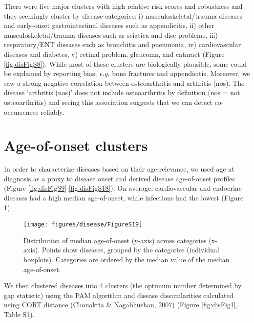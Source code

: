 \documentclass[12pt,twoside]{unicam}
\begin{document}
There were five major clusters with high relative risk scores and robustness and they seemingly cluster by disease categories: i) musculoskeletal/trauma diseases and early-onset gastrointestinal diseases such as appendicitis, ii) other musculoskeletal/trauma diseases such as sciatica and disc problems, iii) respiratory/ENT diseases such as bronchitis and pneumonia, iv) cardiovascular diseases and diabetes, v) retinal problem, glaucoma, and cataract (Figure \ref{fig:disFigS8}). While most of these clusters are biologically plausible, some could be explained by reporting bias, \emph{e.g.} bone fractures and appendicitis. Moreover, we saw a strong negative correlation between osteoarthritis and arthritis (nos). The disease `arthritis (nos)' does not include osteoarthritis by definition (nos = not osteoarthritis) and seeing this association suggests that we can detect co-occurrences reliably.

\hypertarget{age-of-onset-clusters}{%
\section{Age-of-onset clusters}\label{age-of-onset-clusters}}

In order to characterize diseases based on their age-relevance, we used age at diagnosis as a proxy to disease onset and derived disease age-of-onset profiles (Figure \ref{fig:disFigS9}-\ref{fig:disFigS18}). On average, cardiovascular and endocrine diseases had a high median age-of-onset, while infections had the lowest (Figure \ref{fig:disFigS19}).

\begin{figure}

{\centering \texttt{[image: figures/disease/FigureS19]} 

}

\caption[Distribution of median age-of-onset across categories.]{Distribution of median age-of-onset (y-axis) across categories (x-axis). Points show diseases, grouped by the categories (individual boxplots). Categories are ordered by the median value of the median age-of-onset.}\label{fig:disFigS19}
\end{figure}

We then clustered diseases into 4 clusters (the optimum number determined by gap statistic) using the PAM algorithm and disease dissimilarities calculated using CORT distance (Chouakria \& Nagabhushan, \protect\hyperlink{ref-Chouakria2007}{2007}) (Figure \ref{fig:disFig1}, Table S1).
\end{document}
